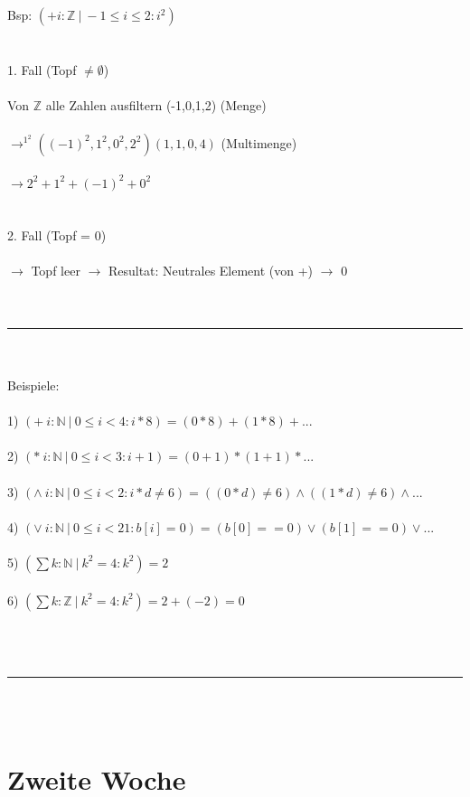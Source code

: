 \documentclass[18pt,a4paper]{article}
\begin{document}
Bsp: $(+ i:\mathbb{Z} \:\vert\: -1\leqslant i\leqslant 2 : i^2)$\\
\\
\\
1. Fall (Topf $\neq \emptyset$)\\
\\
Von $\mathbb{Z}$ alle Zahlen ausfiltern (-1,0,1,2) (Menge)\\
\\
$\rightarrow^{1^2} ((-1)^2, 1^2, 0^2, 2^2) (1,1,0,4)$ (Multimenge)\\
\\
$\rightarrow 2^2 + 1^2 + (-1)^2 + 0^2$\\
\\
\\
2. Fall (Topf = 0)\\
\\
$\rightarrow$ Topf leer $\rightarrow$ Resultat: Neutrales Element (von +) $\rightarrow$ 0\\
\\
\\
\rule{\textwidth}{0.4mm}\\
\\
Beispiele:\\
\\
1) $(+ \:i:\mathbb{N} \:\vert\: 0\leqslant i < 4 : i*8) = (0*8) + (1*8) + ... $\\
\\
2) $(* \:i:\mathbb{N} \:\vert\: 0\leqslant i < 3 : i+1) = (0+1) * (1+1) * ... $\\
\\
3) $(\wedge \:i:\mathbb{N} \:\vert\: 0\leqslant i < 2 : i*d \neq 6) = ((0*d) \neq 6) \wedge ((1*d) \neq 6) \wedge ...  $\\
\\
4) $(\vee \:i:\mathbb{N} \:\vert\: 0\leqslant i < 21 : b[i]=0) = (b[0] == 0) \vee (b[1] == 0) \vee ...  $\\
\\
5) $(\sum k : \mathbb{N} \:\vert\: k^2 = 4 : k^2) = 2$\\
\\
6) $(\sum k : \mathbb{Z} \:\vert\: k^2 = 4 : k^2) = 2 + (-2) = 0$\\
\\
\\
\\
\rule{\textwidth}{0.4mm}\\
\\


\section{Zweite Woche}
\end{document}
